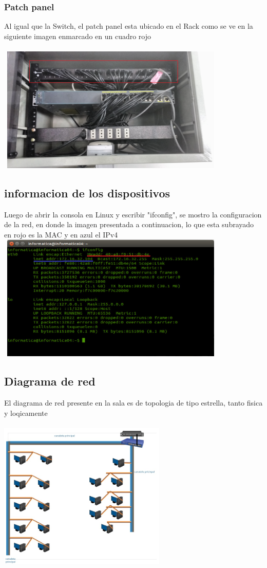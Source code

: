 \documentclass{article}
\begin{document}
\subsubsection{Patch panel}
Al igual que la Switch, el patch panel esta ubicado en el Rack como se ve en la siguiente imagen enmarcado en un cuadro rojo\\ \\ 
\includegraphics[width=11cm, height=6cm]{pp.jpg}
\subsection{informacion de los dispositivos}
Luego de abrir la consola en Linux y escribir "ifconfig", se mostro la configuracion de la red, en donde la imagen presentada a continuacion, lo que esta subrayado en rojo es la MAC y en azul el IPv4\\
\includegraphics[width=11cm, height=6cm]{Mac_IP.png}

\subsection{Diagrama de red}
El diagrama de red presente en la sala es de topologia de tipo estrella, tanto fisica y loqicamente \\ \\
\includegraphics[width=8cm, height=7cm]{Top_fi.png}
\end{document}
